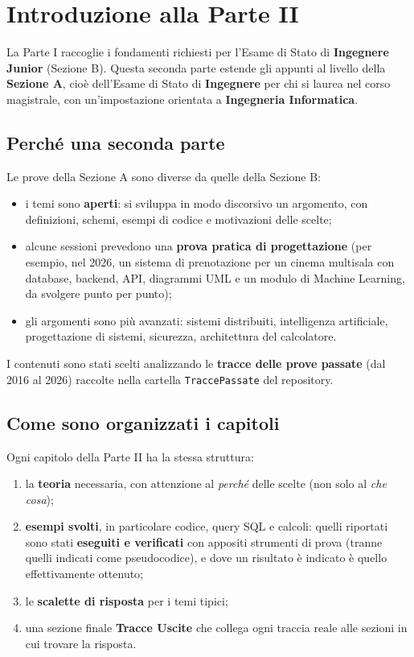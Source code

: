 \chapter*{Introduzione alla Parte II}

La Parte I raccoglie i fondamenti richiesti per l'Esame di Stato di \textbf{Ingegnere Junior} (Sezione B). Questa seconda parte estende gli appunti al livello della \textbf{Sezione A}, cioè dell'Esame di Stato di \textbf{Ingegnere} per chi si laurea nel corso magistrale, con un'impostazione orientata a \textbf{Ingegneria Informatica}.

\section*{Perché una seconda parte}
Le prove della Sezione A sono diverse da quelle della Sezione B:
\begin{itemize}
    \item i temi sono \textbf{aperti}: si sviluppa in modo discorsivo un argomento, con definizioni, schemi, esempi di codice e motivazioni delle scelte;
    \item alcune sessioni prevedono una \textbf{prova pratica di progettazione} (per esempio, nel 2026, un sistema di prenotazione per un cinema multisala con database, backend, API, diagrammi UML e un modulo di Machine Learning, da svolgere punto per punto);
    \item gli argomenti sono più avanzati: sistemi distribuiti, intelligenza artificiale, progettazione di sistemi, sicurezza, architettura del calcolatore.
\end{itemize}
I contenuti sono stati scelti analizzando le \textbf{tracce delle prove passate} (dal 2016 al 2026) raccolte nella cartella \texttt{TraccePassate} del repository.

\section*{Come sono organizzati i capitoli}
Ogni capitolo della Parte II ha la stessa struttura:
\begin{enumerate}
    \item la \textbf{teoria} necessaria, con attenzione al \emph{perché} delle scelte (non solo al \emph{che cosa});
    \item \textbf{esempi svolti}, in particolare codice, query SQL e calcoli: quelli riportati sono stati \textbf{eseguiti e verificati} con appositi strumenti di prova (tranne quelli indicati come pseudocodice), e dove un risultato è indicato è quello effettivamente ottenuto;
    \item le \textbf{scalette di risposta} per i temi tipici;
    \item una sezione finale \textbf{Tracce Uscite} che collega ogni traccia reale alle sezioni in cui trovare la risposta.
\end{enumerate}

